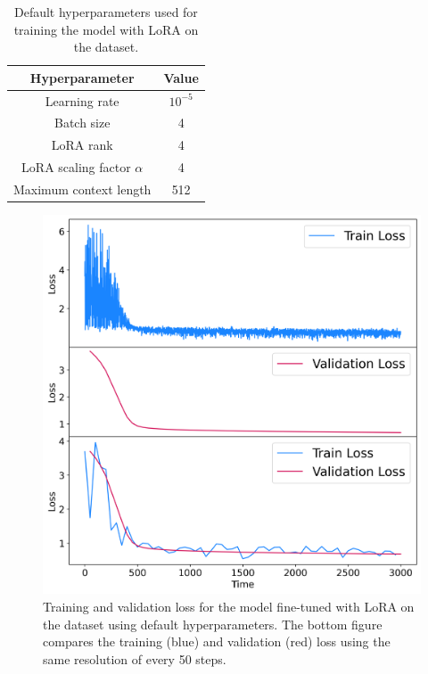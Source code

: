 \documentclass[11pt,a4paper]{article}
\begin{document}
\begin{table}[h]
    \centering
    \begin{tabular}{c|c}
        Hyperparameter & Value \\
        \hline
        Learning rate & $10^{-5}$ \\
        Batch size & 4 \\
        LoRA rank & 4 \\
        LoRA scaling factor $\alpha$ & 4 \\
        Maximum context length & 512 \\
    \end{tabular}
    \caption{Default hyperparameters used for training the model with LoRA on the dataset.}
    \label{tab:lora_default}
\end{table}

\begin{figure}[h]
    \centering
    \includegraphics[width=\columnwidth, keepaspectratio]{../plots/lora_default_loss.png}
    \caption{Training and validation loss for the model fine-tuned with LoRA on the dataset using default hyperparameters. The bottom figure compares the training (blue) and validation (red) loss using the same resolution of every 50 steps.}
    \label{fig:lora_default_loss}
\end{figure}
\end{document}
